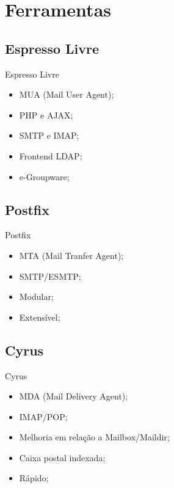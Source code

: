 \renewcommand{\titulo}{Ferramentas}
\section{\titulo}

\renewcommand{\titulo}{Espresso Livre}
\subsection{\titulo}

\begin{frame}{\titulo}
\begin{itemize}
\item MUA (Mail User Agent);
\item PHP e AJAX;
\item SMTP e IMAP;
\item Frontend LDAP;
\item e-Groupware;
\end{itemize}
\end{frame}

\renewcommand{\titulo}{Postfix}
\subsection{\titulo}
\begin{frame}{\titulo}
\begin{itemize}
\item MTA (Mail Tranfer Agent);
\item SMTP/ESMTP;
\item Modular;
\item Extensível;
\end{itemize}
\end{frame}

\renewcommand{\titulo}{Cyrus}
\subsection{\titulo}
\begin{frame}{\titulo}
\begin{itemize}
\item MDA (Mail Delivery Agent);
\item IMAP/POP;
\item Melhoria em relação a Mailbox/Maildir;
\item Caixa postal indexada;
\item Rápido;
\end{itemize}
\end{frame}

